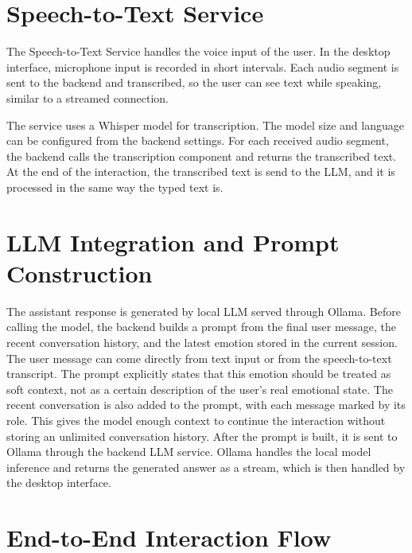 \section{Speech-to-Text Service}

The Speech-to-Text Service handles the voice input of the user. In the desktop interface, microphone input is recorded in short intervals. Each audio segment is sent to the backend and transcribed, so the user can see text while speaking, similar to a streamed connection.

The service uses a Whisper model for transcription. The model size and language can be configured from the backend settings. For each received audio segment, the backend calls the transcription component and returns the transcribed text. At the end of the interaction, the transcribed text is send to the LLM, and it is processed in the same way the typed text is.

\section{LLM Integration and Prompt Construction}

The assistant response is generated by  local LLM served through Ollama. Before calling the model, the backend builds a prompt from the final user message, the recent conversation history, and the latest emotion stored in the current session. The user message can come directly from text input or from the speech-to-text transcript. The prompt explicitly states that this emotion should be treated as soft context, not as a certain description of the user's real emotional state. The recent conversation is also added to the prompt, with each message marked by its role. This gives the model enough context to continue the interaction without storing an unlimited conversation history. After the prompt is built, it is sent to Ollama through the backend LLM service. Ollama handles the local model inference and returns the generated answer as a stream, which is then handled by the desktop interface.

\section{End-to-End Interaction Flow}

